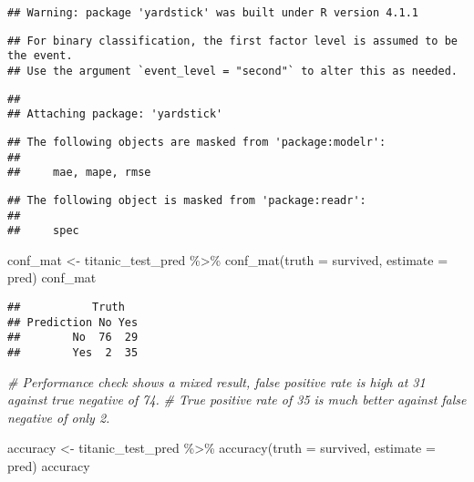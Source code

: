 \documentclass[
]{article}
\newenvironment{Shaded}{\begin{snugshade}}{\end{snugshade}}
\newcommand{\AttributeTok}[1]{\textcolor[rgb]{0.77,0.63,0.00}{#1}}
\newcommand{\CommentTok}[1]{\textcolor[rgb]{0.56,0.35,0.01}{\textit{#1}}}
\newcommand{\FunctionTok}[1]{\textcolor[rgb]{0.00,0.00,0.00}{#1}}
\newcommand{\NormalTok}[1]{#1}
\newcommand{\OtherTok}[1]{\textcolor[rgb]{0.56,0.35,0.01}{#1}}
\newcommand{\SpecialCharTok}[1]{\textcolor[rgb]{0.00,0.00,0.00}{#1}}
\begin{document}
\begin{verbatim}
## Warning: package 'yardstick' was built under R version 4.1.1
\end{verbatim}

\begin{verbatim}
## For binary classification, the first factor level is assumed to be the event.
## Use the argument `event_level = "second"` to alter this as needed.
\end{verbatim}

\begin{verbatim}
## 
## Attaching package: 'yardstick'
\end{verbatim}

\begin{verbatim}
## The following objects are masked from 'package:modelr':
## 
##     mae, mape, rmse
\end{verbatim}

\begin{verbatim}
## The following object is masked from 'package:readr':
## 
##     spec
\end{verbatim}

\begin{Shaded}
\begin{Highlighting}[]
\NormalTok{conf\_mat }\OtherTok{\textless{}{-}}\NormalTok{ titanic\_test\_pred }\SpecialCharTok{\%\textgreater{}\%} 
  \FunctionTok{conf\_mat}\NormalTok{(}\AttributeTok{truth =}\NormalTok{ survived, }\AttributeTok{estimate =}\NormalTok{ pred)}
\NormalTok{conf\_mat}
\end{Highlighting}
\end{Shaded}

\begin{verbatim}
##           Truth
## Prediction No Yes
##        No  76  29
##        Yes  2  35
\end{verbatim}

\begin{Shaded}
\begin{Highlighting}[]
\CommentTok{\# Performance check shows a mixed result, false positive rate is high at 31 against true negative of 74.}
\CommentTok{\# True positive rate of 35 is much better against false negative of only 2.}
\end{Highlighting}
\end{Shaded}

\begin{Shaded}
\begin{Highlighting}[]
\NormalTok{accuracy }\OtherTok{\textless{}{-}}\NormalTok{ titanic\_test\_pred }\SpecialCharTok{\%\textgreater{}\%}
 \FunctionTok{accuracy}\NormalTok{(}\AttributeTok{truth =}\NormalTok{ survived, }\AttributeTok{estimate =}\NormalTok{ pred)}
\NormalTok{accuracy }
\end{Highlighting}
\end{Shaded}
\end{document}
